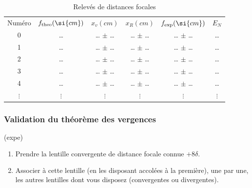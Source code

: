 \documentclass[../main/main.tex]{subfiles}
\begin{document}
\begin{table}[htbp]
	\centering
	\caption{Relevés de distances focales}
	\begin{tabular}{cccccc}
		\toprule
		Numéro   & $f_{\rm theo} (\si{cm})$ & $x_v (\si{cm})$ & $x_R (\si{cm})$ & $f_{\rm exp} (\si{cm})$ & $E_N$
		\\
		0        & …                        & … $\pm $ …      & … $\pm $ …      & … $\pm $ …              & …
		\\
		1        & …                        & … $\pm $ …      & … $\pm $ …      & … $\pm $ …              & …
		\\
		2        & …                        & … $\pm $ …      & … $\pm $ …      & … $\pm $ …              & …
		\\
		3        & …                        & … $\pm $ …      & … $\pm $ …      & … $\pm $ …              & …
		\\
		4        & …                        & … $\pm $ …      & … $\pm $ …      & … $\pm $ …              & …
		\\
		$\vdots$ & $\vdots$                 & $\vdots$        & $\vdots$        & $\vdots$
		         & $\vdots$
		\\
		\bottomrule
	\end{tabular}
\end{table}

\subsubsection{Validation du théorème des vergences}

\begin{tcb}(expe){}
	\begin{enumerate}
		\item Prendre la lentille convergente de distance focale connue $+8\delta$.

		\item Associer à cette lentille (en les disposant accolées à la première),
		      une par une, les autres lentilles dont vous disposez (convergentes ou
		      divergentes).
	\end{enumerate}
\end{tcb}
\end{document}
